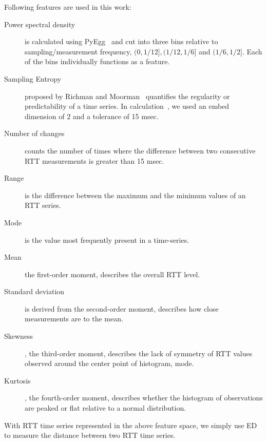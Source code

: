 Following features are used in this work:
\begin{description}
\item[Power spectral density] is calculated using PyEgg~\cite{Bao2011} and cut into three bins relative to sampling/measurement frequency, $(0, 1/12], (1/12, 1/6]$ and $(1/6, 1/2]$. Each of the bins individually functions as a feature.
\item[Sampling Entropy] proposed by Richman and Moorman~\cite{Richman2000} quantifies the regularity or predictability of a time series. In calculation~\cite{Bao2011}, we used an embed dimension of 2 and a tolerance of 15 msec.
\item[Number of changes] counts the number of times where the difference between two consecutive RTT measurements is greater than 15 msec. %
\item[Range] is the difference between the maximum and the minimum values of an RTT series.
\item[Mode] is the value most frequently present in a time-series.
\item[Mean] the first-order moment, describes the overall RTT level.
\item[Standard deviation] is derived from the second-order moment, describes how close measurements are to the mean.
\item[Skewness], the third-order moment, describes the lack of symmetry of RTT values observed around the center point of histogram, mode.
\item[Kurtosis], the fourth-order moment, describes whether the histogram of observations are peaked or flat relative to a normal distribution.
\end{description}
With RTT time series represented in the above feature space, we simply use \acf{ED} to measure the distance between two RTT time series.

